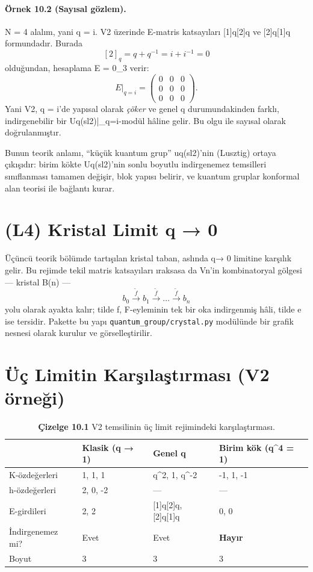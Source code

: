 \documentclass[12pt,a4paper]{report}
\numberwithin{equation}{chapter}
\theoremstyle{plain}
\theoremstyle{definition}
\begin{document}
\paragraph{Örnek 10.2 (Sayısal gözlem).}
N = 4 alalım, yani q = i. V2 üzerinde E-matris katsayıları
[1]q[2]q ve [2]q[1]q formundadır. Burada
\[
  [2]_q = q + q^{-1} = i + i^{-1} = 0
\]
olduğundan, hesaplama E = 0_3 verir:
\[
  E\big|_{q=i} = \begin{pmatrix} 0 & 0 & 0 \\ 0 & 0 & 0 \\ 0 & 0 & 0 \end{pmatrix}.
\]
Yani V2, q = i'de yapısal olarak \emph{çöker} ve genel q
durumundakinden farklı, indirgenebilir bir Uq(sl2)|_q=i-modül hâline
gelir. Bu olgu 
ile sayısal olarak doğrulanmıştır.


Bunun teorik anlamı, ``küçük kuantum grup'' uq(sl2)'nin (Lusztig)
ortaya çıkışıdır: birim kökte Uq(sl2)'nin sonlu boyutlu indirgenemez
temsilleri sınıflanması tamamen değişir, blok yapısı belirir, ve kuantum
gruplar konformal alan teorisi ile bağlantı kurar.

\section{(L4) Kristal Limit q → 0}

Üçüncü teorik bölümde tartışılan kristal taban, aslında q→ 0 limitine
karşılık gelir. Bu rejimde tekil matris katsayıları ıraksasa da Vn'in
kombinatoryal gölgesi --- kristal B(n) ---
\[
  b_0 \xrightarrow{\tilde f} b_1 \xrightarrow{\tilde f} \dots
   \xrightarrow{\tilde f} b_n
\]
yolu olarak ayakta kalır; tilde f, F-eyleminin tek bir oka indirgenmiş
hâli, tilde e ise tersidir. Pakette bu yapı \texttt{quantum\_group/crystal.py}
modülünde bir grafik nesnesi olarak kurulur ve görselleştirilir.

\section{Üç Limitin Karşılaştırması (V2 örneği)}

\begin{table}[h]
\centering
\small
\caption{\textbf{Çizelge 10.1} V2 temsilinin üç limit rejimindeki karşılaştırması.}
\label{tab:limits}
\begin{tabularx}{\textwidth}{@{}lXXX@{}}
\toprule
& Klasik (q → 1) & Genel q & Birim kök (q^4 = 1) \\
\midrule
K-özdeğerleri & 1, 1, 1 & q^2, 1, q^-2 & -1, 1, -1 \\
h-özdeğerleri & 2, 0, -2 & --- & --- \\
E-girdileri & 2, 2 & [1]q[2]q, [2]q[1]q & 0, 0 \\
İndirgenemez mi? & Evet & Evet & \textbf{Hayır} \\
Boyut & 3 & 3 & 3 \\
\bottomrule
\end{tabularx}
\end{table}
\end{document}
